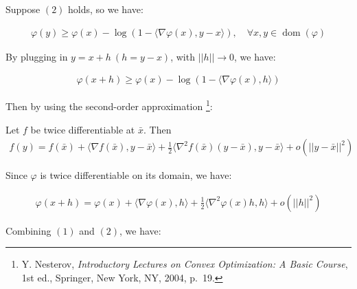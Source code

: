\documentclass{article}
\begin{document}
Suppose $(2)$ holds, so we have:

\begin{align*}
    \varphi(y) \geq \varphi(x) - \log (1 - \langle \nabla \varphi(x), y - x \rangle), \quad \forall x, y \in \operatorname{dom}(\varphi)
\end{align*}

By plugging in $y = x + h \ (h = y - x)$, with $||h|| \rightarrow 0$, we have:

\begin{align*}
    \varphi(x + h) \geq \varphi(x) - \log (1 - \langle \nabla \varphi(x), h \rangle) \tag{1}
\end{align*}

Then by using the second-order approximation
\footnote{Y. Nesterov, \textit{Introductory Lectures on Convex Optimization: A Basic Course}, 1st ed., Springer, New York, NY, 2004, p.~19.}:

\begin{tcolorbox}[bluebox, title = Second-order approximation]
    Let $f$ be twice differentiable at $\bar{x}$. Then
    \begin{align*}
        f(y) = f(\bar{x}) + \langle \nabla f(\bar{x}), y - \bar{x} \rangle + \frac{1}{2} \langle\nabla^2 f(\bar{x}) (y - \bar{x}), y - \bar{x} \rangle + o(||y - \bar{x}||^2)
    \end{align*}
\end{tcolorbox}

Since $\varphi$ is twice differentiable on its domain, we have:

\begin{align*}
    \varphi(x + h) = \varphi(x) + \langle \nabla \varphi(x), h \rangle + \frac{1}{2} \langle\nabla^2 \varphi(x) h, h \rangle + o(||h||^2) \tag{2}
\end{align*}

Combining $(1)$ and $(2)$, we have:
\end{document}
